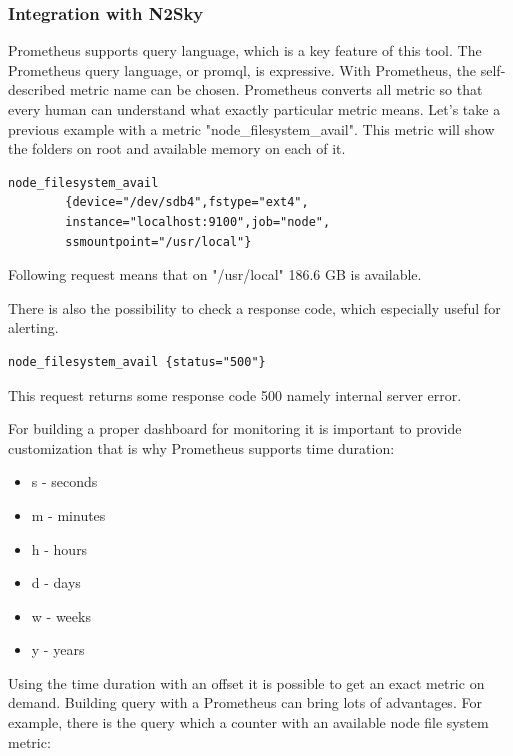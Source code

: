 \subsubsection{Integration with N2Sky}\label{Integration with N2Sky}

Prometheus supports query language, which is a key feature of this tool. The Prometheus query language, or promql, is expressive. 
With Prometheus, the self-described metric name can be chosen. Prometheus converts all metric so that every human can understand what exactly particular metric means. Let's take a previous example with a metric "node\_filesystem\_avail". This metric will show the folders on root and available memory on each of it.

\begin{lstlisting}[caption=Prometheus query]
    node_filesystem_avail 
        {device="/dev/sdb4",fstype="ext4",
        instance="localhost:9100",job="node",
        ssmountpoint="/usr/local"}
\end{lstlisting}

Following request means that on "/usr/local" 186.6 GB is available. 

There is also the possibility to check a response code, which especially useful for alerting. 

\begin{lstlisting}[caption=Prometheus short query]
        node_filesystem_avail {status="500"}
\end{lstlisting}

This request returns some response code 500 namely internal server error. 

For building a proper dashboard for monitoring it is important to provide customization that is why Prometheus supports time duration:

\begin{itemize}
\item s - seconds
\item m - minutes
\item h - hours
\item d - days
\item w - weeks
\item y - years
\end{itemize}

Using the time duration with an offset it is possible to get an exact metric on demand. 
Building query with a Prometheus can bring lots of advantages. For example, there is the query which  a counter with an available node file system metric:

